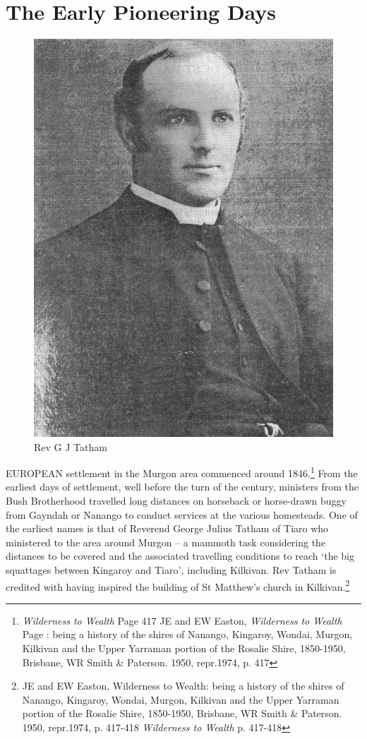 

\chapter{The Early Pioneering Days}
\nobalance








\begin{figure}
\begin{center}
\includegraphics[width=.5\linewidth,center]{../images/RGTatham.jpg}
\caption{Rev G J Tatham}
\end{center}
\end{figure}




\lettrine[lines=3]{E}{UROPEAN}
 settlement in the Murgon area commenced around 1846.\footnote{\emph{Wilderness to Wealth} Page 417 JE and EW Easton, \emph{Wilderness to Wealth} Page : being a history of the shires of Nanango, Kingaroy, Wondai, Murgon, Kilkivan and the Upper Yarraman portion of the Rosalie Shire, 1850-1950, Brisbane, WR Smith \& Paterson. 1950, repr.1974, p. 417} From the earliest days of settlement, well before the turn of the century, ministers from the Bush Brotherhood travelled long distances on horseback or horse-drawn buggy from Gayndah or Nanango to conduct services at the various homesteads. One of the earliest names is that of Reverend George Julius Tatham of Tiaro who ministered to the area around Murgon -- a mammoth task considering the distances to be covered and the associated travelling conditions to reach `the big squattages between Kingaroy and Tiaro'\emph{,} including Kilkivan. Rev Tatham is credited with having inspired the building of St Matthew's church in Kilkivan.\footnote{JE and EW Easton, Wilderness to Wealth: being a history of the shires of Nanango, Kingaroy, Wondai, Murgon, Kilkivan and the Upper Yarraman portion of the Rosalie Shire, 1850-1950, Brisbane, WR Smith \& Paterson. 1950, repr.1974, p. 417-418 \emph{Wilderness to Wealth} p. 417-418}

